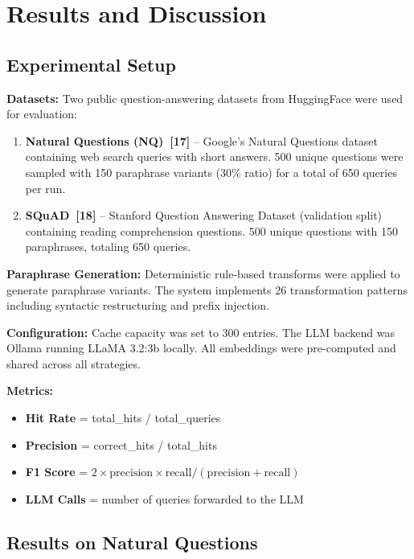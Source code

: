 \documentclass[12pt,a4paper]{report}
\begin{document}
\chapter{Results and Discussion}

\section{Experimental Setup}

\textbf{Datasets:} Two public question-answering datasets from HuggingFace were used for evaluation:

\begin{enumerate}[label=(\roman*),leftmargin=2cm]
\item \textbf{Natural Questions (NQ)~[17]} -- Google's Natural Questions dataset containing web search queries with short answers. 500 unique questions were sampled with 150 paraphrase variants (30\% ratio) for a total of 650 queries per run.
\item \textbf{SQuAD~[18]} -- Stanford Question Answering Dataset (validation split) containing reading comprehension questions. 500 unique questions with 150 paraphrases, totaling 650 queries.
\end{enumerate}

\textbf{Paraphrase Generation:} Deterministic rule-based transforms were applied to generate paraphrase variants. The system implements 26 transformation patterns including syntactic restructuring and prefix injection.

\textbf{Configuration:} Cache capacity was set to 300 entries. The LLM backend was Ollama running LLaMA 3.2:3b locally. All embeddings were pre-computed and shared across all strategies.

\textbf{Metrics:}
\begin{itemize}[leftmargin=2cm]
\item \textbf{Hit Rate} = total\_hits / total\_queries
\item \textbf{Precision} = correct\_hits / total\_hits
\item \textbf{F1 Score} = $2 \times \text{precision} \times \text{recall} / (\text{precision} + \text{recall})$
\item \textbf{LLM Calls} = number of queries forwarded to the LLM
\end{itemize}

\section{Results on Natural Questions}
\end{document}

